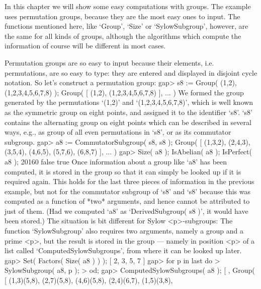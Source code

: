 
In this  chapter we will  show  some easy  computations with groups.  The
example uses permutation groups,  because they are  the most easy ones to
input.   The   functions  mentioned   here,   like   `Group',  `Size'  or
`SylowSubgroup', however, are the same for  all kinds of groups, although
the algorithms which compute the information of  course will be different
in most cases.


Permutation  groups are so  easy  to input  because their elements,  i.e.
permutations, are  so  easy to type:  they are  entered and displayed  in
disjoint cycle notation. So let's construct a permutation group:
\beginexample
    gap> s8 := Group( (1,2), (1,2,3,4,5,6,7,8) );
    Group( [ (1,2), (1,2,3,4,5,6,7,8) ], ... )
\endexample
We   formed  the  group  generated  by   the  permutations  `(1,2)'   and
`(1,2,3,4,5,6,7,8)',  which is well known as the symmetric group on eight
points,  and  assigned  it  to the  identifier `s8'.   `s8' contains  the
alternating group on eight points which can be described in several ways,
e.g., as group of  all even permutations in  `s8',  or  as its commutator
subgroup.
\beginexample
    gap> a8 := CommutatorSubgroup( s8, s8 );
    Group( [ (1,3,2), (2,4,3), (3,5,4), (4,6,5), (5,7,6), (6,8,7) ], ... )
    gap> Size( a8 ); IsAbelian( a8 ); IsPerfect( a8 );
    20160
    false
    true
\endexample
Once information about a group like `a8'  has been computed, it is stored
in the group so that it can simply be looked  up if it is required again.
This   holds for the  last three  pieces  of information  in the previous
example, but  not for the commutator   subgroup of `s8' and  `s8' because
this was computed as  a function of *two* arguments,  and hence cannot be
attributed to just of them. (Had we computed `a8' as `DerivedSubgroup( s8
)', it would have been stored.) The  situation is bit different for Sylow
<p>-subgroups: The  function `SylowSubgroup' also requires two arguments,
namely a group and a prime <p>, but the result is stored in the group ---
namely  in position <p> of   a list called `ComputedSylowSubgroups', from
where it can be looked up later.
\beginexample
    gap> Set( Factors( Size( a8 ) ) );
    [ 2, 3, 5, 7 ]
    gap> for p  in last  do
    >      SylowSubgroup( a8, p );
    >    od;
    gap> ComputedSylowSubgroups( a8 );
    [ , 
      Group( [ (1,3)(5,8), (2,7)(5,8), (4,6)(5,8), (2,4)(6,7), (1,5)(3,8),

